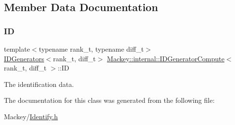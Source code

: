 \subsection{Member Data Documentation}
\mbox{\label{classMackey_1_1internal_1_1IDGeneratorCompute_a6a497058759c758e9f3c895abaa5d837}} 
\subsubsection{\texorpdfstring{ID}{ID}}
{\footnotesize\ttfamily template$<$typename rank\+\_\+t, typename diff\+\_\+t$>$ \\
\hyperlink{classMackey_1_1IDGenerators}{I\+D\+Generators}$<$rank\+\_\+t, diff\+\_\+t$>$ \hyperlink{classMackey_1_1internal_1_1IDGeneratorCompute}{Mackey\+::internal\+::\+I\+D\+Generator\+Compute}$<$ rank\+\_\+t, diff\+\_\+t $>$\+::ID}



The identification data. 



The documentation for this class was generated from the following file\+:\begin{DoxyCompactItemize}
\item 
Mackey/\hyperlink{Identify_8h}{Identify.\+h}\end{DoxyCompactItemize}
